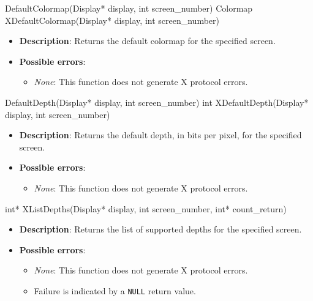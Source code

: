 \documentclass{report}
\begin{document}
\begin{itemize}
        \begin{cppcode}
            DefaultColormap(Display* display, int screen_number)
            Colormap XDefaultColormap(Display* display, int screen_number)
        \end{cppcode}
        \begin{itemize}
            \item \textbf{Description}: Returns the default colormap for the specified screen.
            \item \textbf{Possible errors}:
                \begin{itemize}
                    \item \textit{None}: This function does not generate X protocol errors.
                \end{itemize}
        \end{itemize}

        \begin{cppcode}
            DefaultDepth(Display* display, int screen_number)
            int XDefaultDepth(Display* display, int screen_number)
        \end{cppcode}
        \begin{itemize}
            \item \textbf{Description}: Returns the default depth, in bits per pixel, for the specified screen.
            \item \textbf{Possible errors}:
                \begin{itemize}
                    \item \textit{None}: This function does not generate X protocol errors.
                \end{itemize}
        \end{itemize}

        \begin{cppcode}
            int* XListDepths(Display* display, int screen_number, int* count_return)
        \end{cppcode}
        \begin{itemize}
            \item \textbf{Description}: Returns the list of supported depths for the specified screen.
            \item \textbf{Possible errors}:
                \begin{itemize}
                    \item \textit{None}: This function does not generate X protocol errors.
                    \item Failure is indicated by a \texttt{NULL} return value.
                \end{itemize}
        \end{itemize}


\end{itemize}
\end{document}
